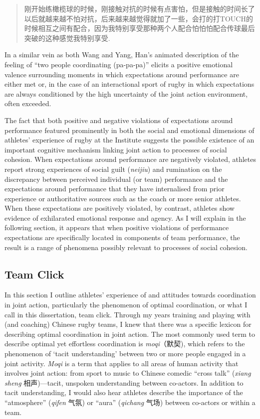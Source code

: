 \begin{CJK}{UTF8}{gbsn}
\begin{quotation}
  	刚开始练橄榄球的时候，刚接触对抗的时候有点害怕，但是接触的时间长了以后就越来越不怕对抗，后来越来越觉得就加了一些，会打的打TOUCH的时候相互之间有配合，因为我特别享受那种两个人配合怕怕怕配合传球最后突破的这种感觉我特别享受.
\end{quotation}

In a similar vein as both Wang and Yang, Han's animated description of the feeling of ``two people coordinating (pa-pa-pa)'' elicits a positive emotional valence surrounding moments in which expectations around performance are either met or, in the case of an interactional sport of rugby in which expectations are always conditioned by the high uncertainty of the joint action environment, often exceeded.

The fact that both positive and negative violations of expectations around performance featured prominently in both the social and emotional dimensions of athletes' experience of rugby at the Institute suggests the possible existence of an important cognitive mechanism linking joint action to processes of social cohesion.  When expectations around performance are negatively violated, athletes report strong experiences of social guilt (\textit{neijiu}) and rumination on the discrepancy between perceived individual (or team) performance and the expectations around performance that they have internalised from prior experience or authoritative sources such as the coach or more senior athletes.  When these expectations are positively violated, by contrast, athletes show evidence of exhilarated emotional response and agency.  As I will explain in the following section, it appears that when positive violations of performance expectations are specifically located in components of team performance, the result is a range of phenomena possibly relevant to processes of social cohesion.



\clearpage
\subsection{Team Click}
In this section I outline athletes' experience of and attitudes towards coordination in joint action, particularly the phenomenon of optimal coordination, or what I call in this dissertation, team click.  Through my years training and playing with (and coaching) Chinese rugby teams, I knew that there was a specific lexicon for describing optimal coordination in joint action.  The most commonly used term to describe optimal yet effortless coordination is \textit{moqi}（默契), which refers to the phenomenon of `tacit understanding' between two or more people engaged in a joint activity. \textit{Moqi} is a term that applies to all areas of human activity that involves joint action: from sport to music to Chinese comedic ``cross talk'' (\textit{xiang sheng} 相声)---tacit, unspoken understanding between co-actors.  In addition to tacit understanding, I would also hear athletes describe the importance of the ``atmosphere'' (\textit{qifen} 气氛) or ``aura'' (\textit{qichang} 气场) between co-actors or within a team.


\end{CJK}

